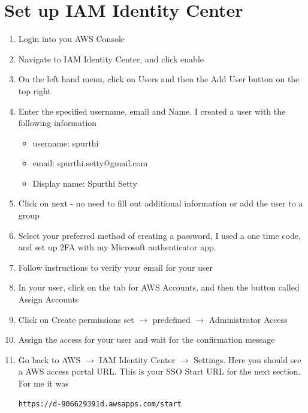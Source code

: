 \section{Set up IAM Identity Center}
\begin{enumerate}
    \item Login into you AWS Console 
    \item Navigate to IAM Identity Center, and click enable 
    \item On the left hand menu, click on Users and then the Add User button on the top right
    \item Enter the specified username, email and Name. I created a user with the following information 
    \begin{itemize}
        \item username: spurthi
        \item email: spurthi.setty@gmail.com
        \item Display name: Spurthi Setty 
    \end{itemize}
    \item Click on next - no need to fill out additional information or add the user to a group
    \item Select your preferred method of creating a password, I used a one time code, and set up 2FA with my Microsoft authenticator app. 
    \item Follow instructions to verify your email for your user
    \item In your user, click on the tab for AWS Accounts, and then the button called Assign Accounts
    \item Click on Create permissions set $\rightarrow$  predefined $\rightarrow$ Administrator Access 
    \item Assign the access for your user and wait for the confirmation message
    \item Go back to AWS $\rightarrow$ IAM Identity Center $\rightarrow$ Settings. Here you should see a AWS access portal URL. This is your SSO Start URL for the next section. For me it was 
\begin{verbatim}
https://d-906629391d.awsapps.com/start
\end{verbatim}
\end{enumerate}



